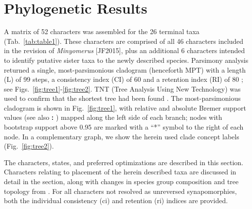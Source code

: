 \documentclass[fleqn,10pt,lineno]{wlpeerj} %
\begin{document}
\newpage
\section*{Phylogenetic Results}\label{sec:results}
	A matrix of 52 characters was assembled for the 26 terminal taxa (Tab.~\ref{tab:table1}).
	These characters are comprised of all 46 characters included in the revision of \textit{Minyomerus} [JF2015], plus an additional 6 characters intended to identify putative sister taxa to the newly described species.
	Parsimony analysis returned a single, most-parsimonious cladogram (henceforth MPT) with a length (L) of 99 steps, a consistency index (CI) of 60 and a retention index (RI) of 80 \citep{farris1989}; see Figs.~\ref{fig:tree1}-\ref{fig:tree2}.
	TNT (Tree Analysis Using New Technology) was used to confirm that the shortest tree had been found \citep{goloboff2008}.
	The most-parsimonious cladogram is shown in Fig.~\ref{fig:tree1}, with relative and absolute Bremer support values (see also \textbf{: }) mapped along the left side of each branch; nodes with bootstrap support above 0.95 are marked with a ``*'' symbol to the right of each node. In a complementary graph, we show the herein used clade concept labels (Fig.~\ref{fig:tree2}).
	
	The characters, states, and preferred optimizations are described in this section.
	Characters relating to placement of the herein described taxa are discussed in detail in the \textbf{} section, along with changes in species group composition and tree topology from \citet{jansen2015}.
	 For all characters not resolved as unreversed synapomorphies, both the individual consistency (ci) and retention (ri) indices are provided.
	
\end{document}
